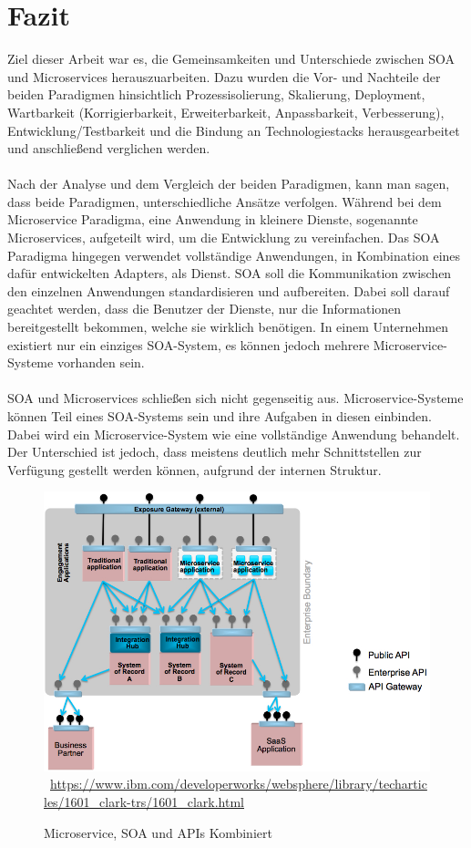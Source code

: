 \chapter{Fazit}
\label{chap:Fazit}
Ziel dieser Arbeit war es, die Gemeinsamkeiten und Unterschiede zwischen SOA und Microservices herauszuarbeiten. Dazu wurden die Vor- und Nachteile der beiden Paradigmen hinsichtlich Prozessisolierung, Skalierung, Deployment, Wartbarkeit (Korrigierbarkeit, Erweiterbarkeit, Anpassbarkeit, Verbesserung), Entwicklung/Testbarkeit und die Bindung an Technologiestacks herausgearbeitet und anschließend verglichen werden.
\\\\
Nach der Analyse und dem Vergleich der beiden Paradigmen, kann man sagen, dass beide Paradigmen, unterschiedliche Ansätze verfolgen. Während bei dem Microservice Paradigma, eine Anwendung in kleinere Dienste, sogenannte Microservices, aufgeteilt wird, um die Entwicklung zu vereinfachen. Das SOA Paradigma hingegen verwendet vollständige Anwendungen, in Kombination eines dafür entwickelten Adapters, als Dienst. SOA soll die Kommunikation zwischen den einzelnen Anwendungen standardisieren und aufbereiten. Dabei soll darauf geachtet werden, dass die Benutzer der Dienste, nur die Informationen bereitgestellt bekommen, welche sie wirklich benötigen. In einem Unternehmen existiert nur ein einziges SOA-System, es können jedoch mehrere Microservice-Systeme vorhanden sein.
\\\\
SOA und Microservices schließen sich nicht gegenseitig aus. Microservice-Systeme können Teil eines SOA-Systems sein und ihre Aufgaben in diesen einbinden. Dabei wird ein Microservice-System wie eine vollständige Anwendung behandelt. Der  Unterschied ist jedoch, dass meistens deutlich mehr Schnittstellen zur Verfügung gestellt werden können, aufgrund der internen Struktur.
\begin{figure}[htb]
    \centering 
    \includegraphics[width=\textwidth]{content/images/figure8}\
    \quelle\url{https://www.ibm.com/developerworks/websphere/library/techarticles/1601_clark-trs/1601_clark.html}
    \caption{Microservice, SOA und APIs Kombiniert}
    \label{fig:MicroservicesSOAAndAPIsCombined} 
\end{figure}

